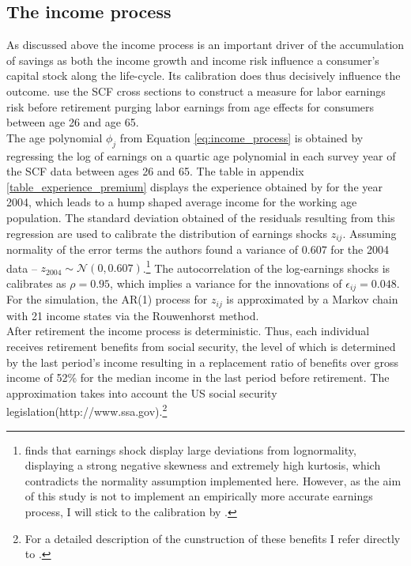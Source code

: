 \documentclass[12pt,a4paper,leqno]{article}
\theoremstyle{definition}
\begin{document}
\subsection{The income process}
As discussed above the income process is an important driver of the accumulation of savings as both the income growth and income risk influence a consumer's capital stock along the life-cycle. Its calibration does thus decisively influence the outcome. 
\cite{hintermaier2011} use the SCF cross sections to construct a measure for labor earnings risk before retirement purging labor earnings from age effects for consumers between age 26 and age 65.\\ 
The age polynomial $\phi_{j}$ from Equation \ref{eq:income_process} is obtained by regressing the log of earnings on a quartic age polynomial in each survey year of the SCF data between ages 26 and 65. The table in appendix \ref{table_experience_premium} displays the experience obtained by \cite{hintermaier2011} for the year 2004, which leads to a hump shaped average income for the working age population.
The standard deviation obtained of the residuals resulting from this regression are used to calibrate the distribution of earnings shocks $z_{ij}$. Assuming normality of the error terms the authors found a variance of $0.607$ for the 2004 data \---  $z_{2004} \sim \mathcal{N}(0,0.607)$.\footnote{\cite{guvenen2015data} finds that earnings shock display large deviations from lognormality, displaying a strong negative skewness and extremely high kurtosis, which contradicts the normality assumption implemented here. However, as the aim of this study is not to implement an empirically more accurate earnings process, I will stick to the calibration by \cite{hintermaier2011}.} The autocorrelation of the log-earnings shocks is calibrates as $\rho = 0.95$, which implies a variance for the innovations of $\epsilon_{ij} = 0.048$. For the simulation, the AR(1) process for $z_{ij}$ is approximated by a Markov chain with 21 income states via the Rouwenhorst method. \\
After retirement the income process is deterministic. Thus, each individual receives retirement benefits from social security, the level of which is determined by the last period's income resulting in a replacement ratio of benefits over gross income of 52\% for the median income in the last period before retirement. The approximation takes into account the US social security legislation(http://www.ssa.gov).\footnote{For a detailed description of the cunstruction of these benefits I refer directly to \cite{hintermaier2011}.} \\
\end{document}
